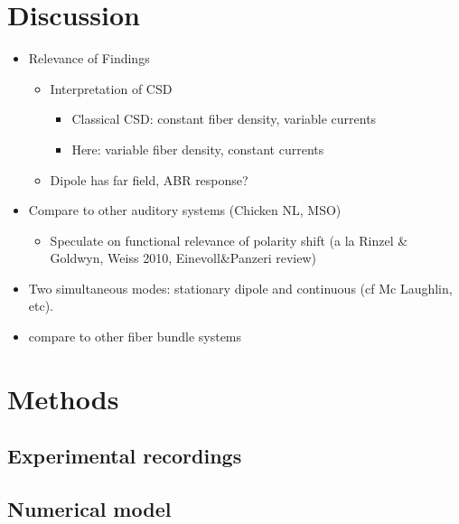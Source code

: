 \documentclass[]{article}
\begin{document}
\section{Discussion}\label{discussion}

\begin{itemize}
\itemsep1pt\parskip0pt
\item
  Relevance of Findings

  \begin{itemize}
  \itemsep1pt\parskip0pt
  \item
    Interpretation of CSD

    \begin{itemize}
    \itemsep1pt\parskip0pt
    \item
      Classical CSD: constant fiber density, variable currents
    \item
      Here: variable fiber density, constant currents
    \end{itemize}
  \item
    Dipole has far field, ABR response?
  \end{itemize}
\item
  Compare to other auditory systems (Chicken NL, MSO)

  \begin{itemize}
  \itemsep1pt\parskip0pt
  \item
    Speculate on functional relevance of polarity shift (a la Rinzel \&
    Goldwyn, Weiss 2010, Einevoll\&Panzeri review)
  \end{itemize}
\item
  Two simultaneous modes: stationary dipole and continuous (cf Mc
  Laughlin, etc).
\item
  compare to other fiber bundle systems
\end{itemize}

\section{Methods}\label{methods}

\subsection{Experimental recordings}\label{experimental-recordings}

\subsection{Numerical model}\label{numerical-model}
\end{document}
